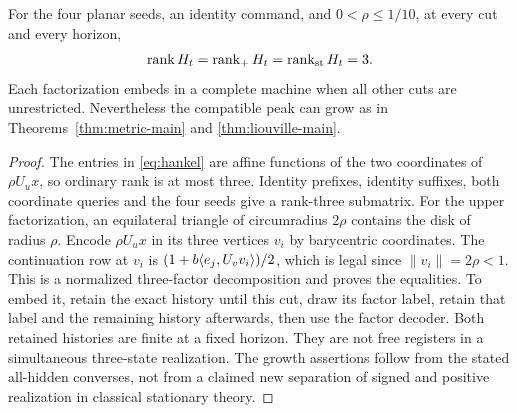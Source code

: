 \begin{proposition}\label{prop:rank-three44}
For the four planar seeds, an identity command, and $0<\rho\le1/10$,
at every cut and every horizon,
\begin{equation}\label{eq:three-ranks}
 \operatorname{rank} H_t=\operatorname{rank}_+H_t=\operatorname{rank}_{\mathrm{st}}H_t=3.
\end{equation}
Each factorization embeds in a complete machine when all other cuts
are unrestricted. Nevertheless the compatible peak can grow as in
Theorems~\ref{thm:metric-main} and \ref{thm:liouville-main}.
\end{proposition}
\begin{proof}
The entries in \eqref{eq:hankel} are affine functions of the two
coordinates of $\rho U_ux$, so ordinary rank is at most three. Identity
prefixes, identity suffixes, both coordinate queries and the four seeds
give a rank-three submatrix. For the upper factorization, an equilateral
triangle of circumradius $2\rho$ contains the disk of radius $\rho$.
Encode $\rho U_ux$ in its three vertices $v_i$ by barycentric coordinates.
The continuation row at $v_i$ is
$(1+b\langle e_j,U_vv_i\rangle)/2$, which is legal since $\|v_i\|=2\rho<1$.
This is a normalized three-factor decomposition and proves the equalities.
To embed it, retain the exact history until this cut, draw its factor
label, retain that label and the remaining history afterwards, then use
the factor decoder. Both retained histories are finite at a fixed
horizon. They are not free registers in a simultaneous three-state
realization. The growth assertions follow from the stated all-hidden
converses, not from a claimed new separation of signed and positive
realization in classical stationary theory.
\end{proof}
